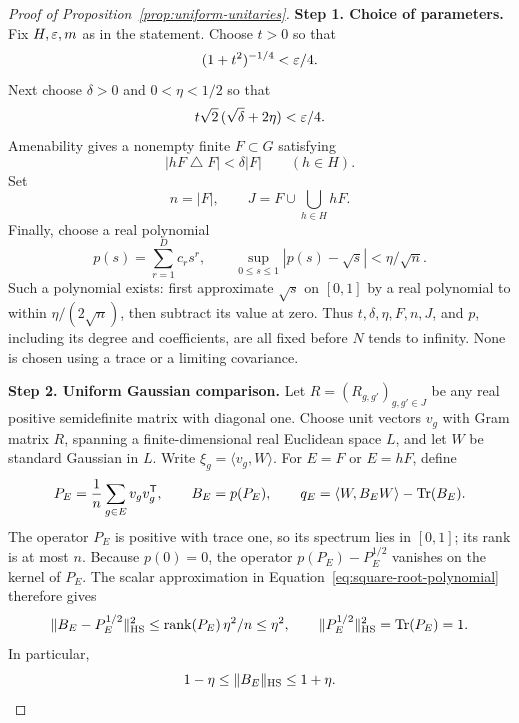 \begin{proof}[Proof of Proposition~\ref{prop:uniform-unitaries}]
\textbf{Step 1. Choice of parameters.}
Fix \(H,\varepsilon,m\) as in the statement. Choose \(t>0\) so that
\begin{equation}\label{eq:gaussian-t-choice}
 (1+t^2)^{-1/4}<\varepsilon/4.
\end{equation}
Next choose \(\delta>0\) and \(0<\eta<1/2\) so that
\begin{equation}\label{eq:gaussian-error-choice}
 t\sqrt{2}\,(\sqrt{\delta}+2\eta)<\varepsilon/4.
\end{equation}
Amenability gives a nonempty finite \(F\subset G\) satisfying
\[
 |hF\mathbin{\triangle}F|<\delta|F|
 \qquad(h\in H).
\]
Set
\[
 n=|F|,
 \qquad J=F\cup\bigcup_{h\in H}hF.
\]
Finally, choose a real polynomial
\begin{equation}\label{eq:square-root-polynomial}
 p(s)=\sum_{r=1}^{D}c_rs^r,
 \qquad
 \sup_{0\leq s\leq1}|p(s)-\sqrt{s}|<\eta/\sqrt n.
\end{equation}
Such a polynomial exists: first approximate \(\sqrt{s}\) on
\([0,1]\) by a real polynomial to within
\(\eta/(2\sqrt n)\), then subtract its value at zero.
Thus \(t,\delta,\eta,F,n,J\), and \(p\), including its degree
and coefficients, are all fixed before \(N\) tends to infinity.
None is chosen using a trace or a limiting covariance.

\textbf{Step 2. Uniform Gaussian comparison.}
Let \(R=(R_{g,g'})_{g,g'\in J}\) be any real positive semidefinite
matrix with diagonal one. Choose unit vectors \(v_g\) with Gram
matrix \(R\), spanning a finite-dimensional real Euclidean space
\(L\), and let \(W\) be standard Gaussian in \(L\). Write
\(\xi_g=\langle v_g,W\rangle\). For \(E=F\) or \(E=hF\), define
\[
 P_E=\frac1n\sum_{g\in E}v_gv_g^{\mathsf T},
 \qquad
 B_E=p(P_E),
 \qquad
 q_E=\langle W,B_EW\rangle-\operatorname{Tr}(B_E).
\]
The operator \(P_E\) is positive with trace one, so its spectrum
lies in \([0,1]\); its rank is at most \(n\).
Because \(p(0)=0\), the operator
\(p(P_E)-P_E^{1/2}\) vanishes on the kernel of \(P_E\).
The scalar approximation in Equation~\eqref{eq:square-root-polynomial}
therefore gives
\begin{equation}\label{eq:gaussian-rank-control}
 \|B_E-P_E^{1/2}\|_{\mathrm{HS}}^2
 \leq \operatorname{rank}(P_E)\,\eta^2/n
 \leq\eta^2,
 \qquad
 \|P_E^{1/2}\|_{\mathrm{HS}}^2=\operatorname{Tr}(P_E)=1.
\end{equation}
In particular,
\begin{equation}\label{eq:gaussian-nondegeneracy}
 1-\eta\leq\|B_E\|_{\mathrm{HS}}\leq1+\eta.
\end{equation}


\end{proof}
